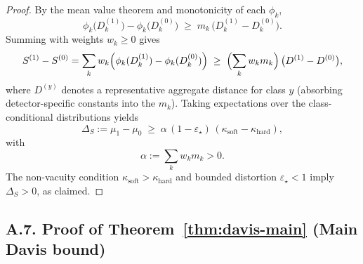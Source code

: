 \documentclass[11pt]{article}
\begin{document}
\begin{proof}
By the mean value theorem and monotonicity of each $\phi_k$,
\[
\phi_k\bigl(D_k^{(1)}\bigr) - \phi_k\bigl(D_k^{(0)}\bigr)
\;\ge\;
m_k\,\bigl(D_k^{(1)} - D_k^{(0)}\bigr).
\]
Summing with weights $w_k\ge 0$ gives
\[
S^{(1)} - S^{(0)}
=
\sum_{k} w_k \Bigl(
\phi_k(D_k^{(1)}) - \phi_k(D_k^{(0)})
\Bigr)
\;\ge\;
\Bigl(\sum_k w_k m_k\Bigr)\,
\bigl(D^{(1)} - D^{(0)}\bigr),
\]
where $D^{(y)}$ denotes a representative aggregate distance for class $y$ (absorbing detector-specific
constants into the $m_k$).  Taking expectations over the class-conditional distributions yields
\[
\Delta_S := \mu_1 - \mu_0
\;\ge\;
\alpha\,(1-\varepsilon_\star)\,(\kappa_{\mathrm{soft}}-\kappa_{\mathrm{hard}}),
\]
with
\[
\alpha := \sum_{k} w_k m_k > 0.
\]
The non-vacuity condition $\kappa_{\mathrm{soft}}>\kappa_{\mathrm{hard}}$ and bounded distortion
$\varepsilon_\star<1$ imply $\Delta_S>0$, as claimed.
\end{proof}

\medskip

\subsection*{A.7. Proof of Theorem~\ref{thm:davis-main} (Main Davis bound)}
\end{document}
